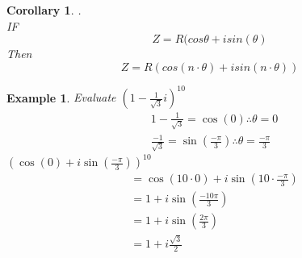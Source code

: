 \documentclass[English, 12pt]{article}
\newtheorem{corollary}[theorem]{Corollary}
\newtheorem{example}[theorem]{Example}
\begin{document}
\begin{corollary} .\\
IF
\begin{equation*}
Z = R(cos\theta + isin(\theta)
\end{equation*}
Then
\begin{equation*}
Z = R(cos(n\cdot \theta) + isin(n\cdot \theta))
\end{equation*}
\end{corollary}

\begin{example} Evaluate $ (1-\frac{1}{\sqrt{3}}i)^{10} $
\begin{align*}
& 1-\frac{1}{\sqrt{3}} = \cos (0) \therefore \theta = 0 \\
& \frac{-1}{\sqrt{3}} = \sin (\frac{-\pi}{3}) \therefore \theta = \frac{-\pi}{3}
\end{align*}
$(\cos(0) + i\sin (\frac{-\pi}{3}))^{10}$ \\
\begin{align*}
&= \cos(10 \cdot 0) + i\sin (10 \cdot \frac{-\pi}{3})\\
&= 1 + i\sin (\frac{-10\pi}{3}) \\
&= 1 + i\sin (\frac{2\pi}{3}) \\
&= 1 + i \frac{\sqrt{3}}{2} \\
\end{align*}

\end{example}
\end{document}
